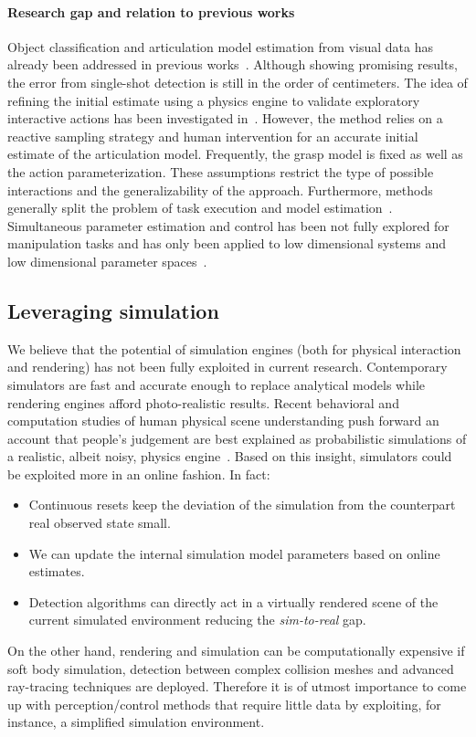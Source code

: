 \paragraph{Research gap and relation to previous works} Object classification and articulation model estimation from visual data has already been addressed in previous works~\cite{he2017mask, li2020category}. Although showing promising results, the error from single-shot detection is still in the order of centimeters. The idea of refining the initial estimate using a physics engine to validate exploratory interactive actions has been investigated in~\cite{eppner2018physics}. However, the method relies on a reactive sampling strategy and human intervention for an accurate initial estimate of the articulation model. Frequently, the grasp model is fixed as well as the action parameterization. These assumptions restrict the type of possible interactions and the generalizability of the approach. Furthermore, methods generally split the problem of task execution and model estimation~\cite{eppner2018physics}. Simultaneous parameter estimation and control has been not fully explored for manipulation tasks and has only been applied to low dimensional systems and low dimensional parameter spaces~\cite{barcelos2021dual}. 

\subsection{Leveraging simulation} We believe that the potential of simulation engines (both for physical interaction and rendering) has not been fully exploited in current research. Contemporary simulators are fast and accurate enough to replace analytical models while rendering engines afford photo-realistic results. Recent behavioral and computation studies of human physical scene understanding push forward an account that people's judgement are best explained as probabilistic simulations of a realistic, albeit noisy, physics engine~\cite{wu2015galileo}.
Based on this insight, simulators could be exploited more in an online fashion. In fact: 
\begin{itemize}
\item Continuous resets keep the deviation of the simulation from the counterpart real observed state small.
\item We can update the internal simulation model parameters based on online estimates.
\item Detection algorithms can directly act in a virtually rendered scene of the current simulated environment reducing the \emph{sim-to-real} gap.
\end{itemize}
On the other hand, rendering and simulation can be computationally expensive if soft body simulation, detection between complex collision meshes and advanced ray-tracing techniques are deployed. Therefore it is of utmost importance to come up with perception/control methods that require little data by exploiting, for instance, a simplified simulation environment. 

